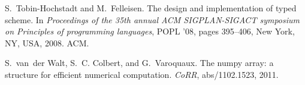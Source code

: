 \documentclass[9pt]{sigplanconf}
\begin{document}
\begin{thebibliography}{42}
S.~Tobin-Hochstadt and M.~Felleisen.
\newblock The design and implementation of typed scheme.
\newblock In \emph{Proceedings of the 35th annual ACM SIGPLAN-SIGACT symposium
  on Principles of programming languages}, POPL '08, pages 395--406, New York,
  NY, USA, 2008. ACM.

S.~van~der Walt, S.~C. Colbert, and G.~Varoquaux.
\newblock The numpy array: a structure for efficient numerical computation.
\newblock \emph{CoRR}, abs/1102.1523, 2011.

\end{thebibliography}
\end{document}
